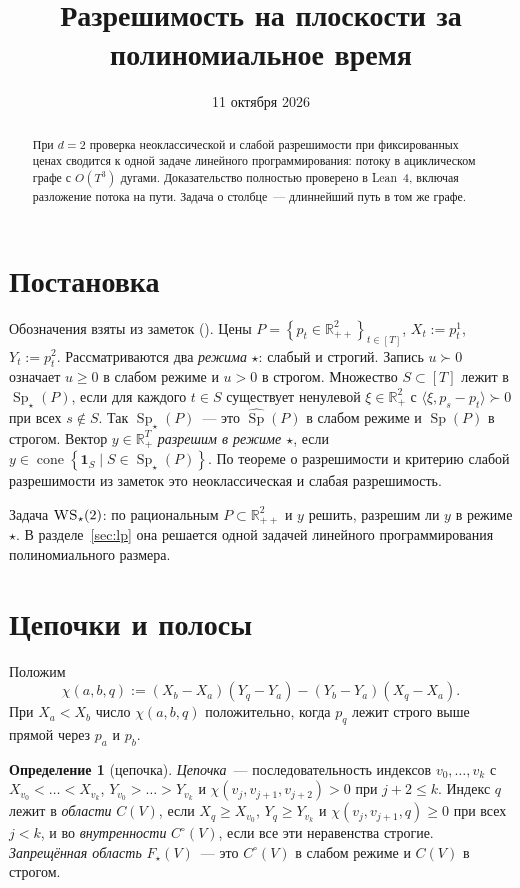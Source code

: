 \documentclass[a4paper,11pt]{article}
\title{Разрешимость на плоскости за полиномиальное время}
\author{}
\date{11 октября 2026}
\theoremstyle{plain}
\theoremstyle{definition}
\newtheorem{definition}[theorem]{Определение}
\theoremstyle{remark}
\newcommand{\R}{\mathbb{R}}
\newcommand{\set}[1]{\left\{ #1 \right\}}
\newcommand{\ip}[2]{\langle #1, #2\rangle}
\newcommand{\Rpp}[1][2]{\R^{#1}_{++}}
\newcommand{\Rp}[1][2]{\R^{#1}_{+}}
\DeclareMathOperator{\cone}{cone}
\DeclareMathOperator{\Sp}{Sp}
\newcommand{\WS}{\textsc{WS}}
\newcommand{\Spm}{\Sp_\star}
\newcommand{\gs}{\mathrel{\succ}}
\begin{document}
\maketitle

\begin{abstract}
При $d=2$ проверка неоклассической и слабой разрешимости при фиксированных ценах сводится к одной задаче линейного программирования: потоку в ациклическом графе с $O(T^3)$ дугами. Доказательство полностью проверено в Lean~4, включая разложение потока на пути. Задача о столбце~--- длиннейший путь в том же графе.
\end{abstract}

\section{Постановка}

Обозначения взяты из заметок (). Цены $P=\set{p_t\in\Rpp}_{t\in[T]}$, $X_t:=p^1_t$, $Y_t:=p^2_t$. Рассматриваются два \emph{режима} $\star$: слабый и строгий. Запись $u\gs0$ означает $u\ge0$ в слабом режиме и $u>0$ в строгом. Множество $S\subset[T]$ лежит в $\Spm(P)$, если для каждого $t\in S$ существует ненулевой $\xi\in\Rp$ с $\ip{\xi}{p_s-p_t}\gs0$ при всех $s\notin S$. Так $\Spm(P)$~--- это $\widehat{\Sp}(P)$ в слабом режиме и $\Sp(P)$ в строгом. Вектор $y\in\Rp[T]$ \emph{разрешим в режиме $\star$}, если $y\in\cone\set{\mathbf 1_S\mid S\in\Spm(P)}$. По теореме о разрешимости и критерию слабой разрешимости из заметок это неоклассическая и слабая разрешимость.

Задача $\WS_\star(2)$: по рациональным $P\subset\Rpp$ и $y$ решить, разрешим ли $y$ в режиме $\star$. В разделе~\ref{sec:lp} она решается одной задачей линейного программирования полиномиального размера.

\section{Цепочки и полосы}\label{sec:chains}

Положим
\[
    \chi(a,b,q):=(X_b-X_a)(Y_q-Y_a)-(Y_b-Y_a)(X_q-X_a).
\]
При $X_a<X_b$ число $\chi(a,b,q)$ положительно, когда $p_q$ лежит строго выше прямой через $p_a$ и $p_b$.

\begin{definition}[цепочка]\label{def:chain}
    \emph{Цепочка}~--- последовательность индексов $v_0,\dots,v_k$ с $X_{v_0}<\dots<X_{v_k}$, $Y_{v_0}>\dots>Y_{v_k}$ и $\chi(v_j,v_{j+1},v_{j+2})>0$ при $j+2\le k$. Индекс $q$ лежит в \emph{области} $C(V)$, если $X_q\ge X_{v_0}$, $Y_q\ge Y_{v_k}$ и $\chi(v_j,v_{j+1},q)\ge0$ при всех $j<k$, и во \emph{внутренности} $C^\circ(V)$, если все эти неравенства строгие. \emph{Запрещённая область} $F_\star(V)$~--- это $C^\circ(V)$ в слабом режиме и $C(V)$ в строгом.
\end{definition}
\end{document}
